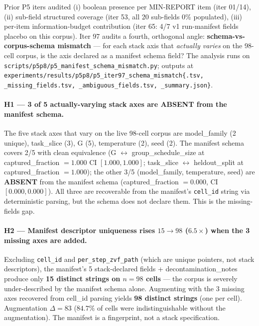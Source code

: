 \documentclass{article}  \usepackage[preprint,nonatbib]{neurips_2026} \usepackage[numbers]{natbib}
\begin{document}
Prior P5 iters audited (i) boolean presence per MIN-REPORT item
(iter 01/14), (ii) sub-field structured coverage (iter 53, all 20
sub-fields 0\% populated), (iii) per-item information-budget
contribution (iter 65: 4/7 v1 run-manifest fields placebo on this corpus). Iter 97
audits a fourth, orthogonal angle: \textbf{schema-vs-corpus-schema
mismatch} --- for each stack axis that \emph{actually varies} on the
98-cell corpus, is the axis declared as a manifest schema field? The
analysis runs on
\texttt{scripts/p5p8/p5\_manifest\_schema\_mismatch.py}; outputs at
\texttt{experiments/results/p5p8/p5\_iter97\_schema\_mismatch\{.tsv,
\_missing\_fields.tsv, \_ambiguous\_fields.tsv, \_summary.json\}}.

\paragraph{H1 --- 3 of 5 actually-varying stack axes are ABSENT from
the manifest schema.}
The five stack axes that vary on the live 98-cell corpus are
\textsf{model\_family} (2 unique), \textsf{task\_slice} (3),
\textsf{G} (5), \textsf{temperature} (2), \textsf{seed} (2). The
manifest schema covers 2/5 with clean equivalence (\textsf{G}
$\leftrightarrow$ \textsf{group\_schedule\_size} at captured\_fraction
$=1.000$ CI $[1.000, 1.000]$; \textsf{task\_slice} $\leftrightarrow$
\textsf{heldout\_split} at captured\_fraction $=1.000$); the other
3/5 (\textsf{model\_family}, \textsf{temperature}, \textsf{seed})
are \textbf{ABSENT} from the manifest schema
(captured\_fraction $=0.000$, CI $[0.000, 0.000]$). All three are
recoverable from the manifest's \texttt{cell\_id} string via
deterministic parsing, but the schema does not declare them. This
is the missing-fields gap.

\paragraph{H2 --- Manifest descriptor uniqueness rises $15 \to 98$
($6.5\times$) when the 3 missing axes are added.}
Excluding \texttt{cell\_id} and \texttt{per\_step\_zvf\_path} (which
are unique pointers, not stack descriptors), the manifest's 5
stack-declared fields + \textsf{decontamination\_notes} produce
only \textbf{15 distinct strings on $n{=}98$ cells} --- the corpus
is severely under-described by the manifest schema alone. Augmenting
with the 3 missing axes recovered from cell\_id parsing yields
\textbf{98 distinct strings} (one per cell). Augmentation
$\Delta = 83$ ($84.7\%$ of cells were indistinguishable without
the augmentation). The manifest is a fingerprint, not a stack
specification.
\end{document}

